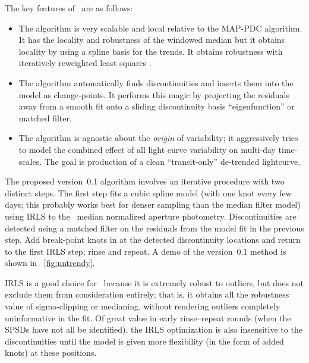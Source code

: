 \documentclass[letterpaper,12pt,preprint]{hack_aastex}
\newcommand{\Untrendy}{\package{Untrendy}}
\begin{document}
The key features of \Untrendy\ are as follows:
\begin{itemize}
\item The algorithm is very scalable and local relative to the MAP-PDC
  algorithm.  It has the locality and robustness of the
  windowed median but
  it obtains locality by using a spline basis for the trends.  It obtains
  robustness with iteratively reweighted least squares \citep[IRLS; for
  example][]{blind}.
\item The algorithm automatically finds discontinuities and inserts
  them into the model as change-points.
  It performs this magic by projecting the residuals away from a smooth fit
  onto a sliding discontinuity basis ``eigenfunction'' or matched filter.
\item The algorithm is agnostic about the \emph{origin} of variability; it
  aggressively tries to model the combined effect of all light curve variability
  on multi-day time-scales.
  The goal is production of a clean ``transit-only'' de-trended lightcurve.
\end{itemize}

The proposed version~0.1 algorithm involves an iterative procedure with two
distinct steps.
The first step fits a cubic spline model (with one knot every few days; this
probably works best for denser sampling than the median filter model) using
IRLS to the \Kepler\ median normalized aperture photometry.
Discontinuities are detected using a matched filter on the residuals
from the model fit in the previous step.
Add break-point knots in at the detected discontinuity locations and return to the first IRLS
step; rinse and repeat.  A demo of the version~0.1 method is shown in
\figurename~\ref{fig:untrendy}.%

IRLS is a good choice for \Untrendy\ because it is extremely robust to
outliers, but does not exclude them from consideration entirely; that is, it
obtains all the robustness value of sigma-clipping or medianing, without
rendering outliers completely uninformative in the fit.
Of great value in early rinse--repeat rounds (when the SPSDs have not all be identified),
the IRLS optimization is also insensitive to the
discontinuities until the model is given more flexibility (in the form of
added knots) at these positions.
\end{document}
